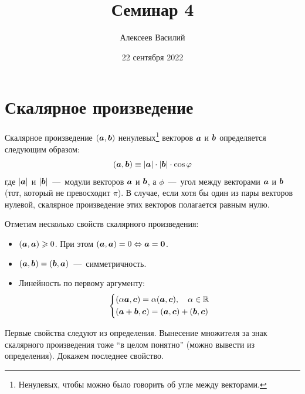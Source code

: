 \documentclass[a4paper,12pt]{article}
\author{Алексеев Василий}
\title{Семинар 4}
\date{22 сентября 2022}
\begin{document}
  \maketitle
  
  \tableofcontents

  \thispagestyle{empty}
  
  \newpage
  
  


  \section{Скалярное произведение}
  
  \begin{definition}
    Скалярное произведение $(\boldsymbol a, \boldsymbol b)$ ненулевых\footnote{Ненулевых, чтобы можно было говорить об угле между векторами.} векторов $\boldsymbol a$ и $\boldsymbol b$ определяется следующим образом:
    \begin{equation}
      (\boldsymbol a, \boldsymbol b) \equiv |\boldsymbol a| \cdot |\boldsymbol b| \cdot \cos \varphi
    \end{equation}
    где $|\boldsymbol a|$ и $|\boldsymbol b|$~---~модули векторов $\boldsymbol a$ и $\boldsymbol b$,
    а $\phi$~---~угол между векторами $\boldsymbol a$ и $\boldsymbol b$ (тот, который не превосходит $\pi$).
    В случае, если хотя бы один из пары векторов нулевой, скалярное произведение этих векторов полагается равным нулю.
  \end{definition}
  
  Отметим несколько свойств скалярного произведения:
  \begin{itemize}
    \item $(\boldsymbol a, \boldsymbol a) \geqslant 0$. При этом $(\bds a, \bds a) \hm= 0 \hm\Leftrightarrow \bds a \hm= \bds 0$.
    \item $(\boldsymbol a, \boldsymbol b) = (\boldsymbol b, \boldsymbol a)$~---~симметричность.
    \item Линейность по первому аргументу:
      \[
        \left\{
          \begin{aligned}
            &(\alpha \boldsymbol a, \boldsymbol c) = \alpha (\boldsymbol a, \boldsymbol c),\quad \alpha \in \operatorname{\mathbb R}\\
            &(\boldsymbol a + \boldsymbol b, \boldsymbol c) = (\boldsymbol a, \boldsymbol c) + (\boldsymbol b, \boldsymbol c)
          \end{aligned}
        \right.
      \]
  \end{itemize}
  
  Первые свойства следуют из определения.
  Вынесение множителя за знак скалярного произведения тоже ``в целом понятно'' (можно вывести из определения).
  Докажем последнее свойство.
  
\end{document}
